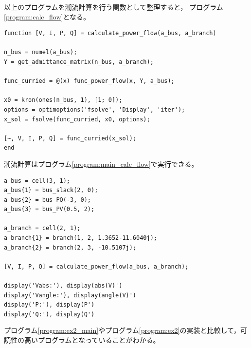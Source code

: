 \documentclass[tombow,dvipdfmx]{corona-a5-1.1}
\begin{document}
{\begin{例}[母線の実装の分離]
以上のプログラムを潮流計算を行う関数として整理すると，
プログラム\ref{program:calc_flow}となる。

\smallskip
\begin{PROGRAMA}[count,title={calculate\_power\_flow.m}]\label{program:calc_flow}
\begin{verbatim}
function [V, I, P, Q] = calculate_power_flow(a_bus, a_branch)

n_bus = numel(a_bus);
Y = get_admittance_matrix(n_bus, a_branch);

func_curried = @(x) func_power_flow(x, Y, a_bus);

x0 = kron(ones(n_bus, 1), [1; 0]);
options = optimoptions('fsolve', 'Display', 'iter');
x_sol = fsolve(func_curried, x0, options);

[~, V, I, P, Q] = func_curried(x_sol);
end
\end{verbatim}
\end{PROGRAMA}

潮流計算はプログラム\ref{program:main_calc_flow}で実行できる。
\smallskip
\begin{PROGRAMA}[count,title={main\_power\_flow.m}]\label{program:main_calc_flow}
\begin{verbatim}
a_bus = cell(3, 1);
a_bus{1} = bus_slack(2, 0);
a_bus{2} = bus_PQ(-3, 0);
a_bus{3} = bus_PV(0.5, 2);

a_branch = cell(2, 1);
a_branch{1} = branch(1, 2, 1.3652-11.6040j);
a_branch{2} = branch(2, 3, -10.5107j);

[V, I, P, Q] = calculate_power_flow(a_bus, a_branch);

display('Vabs:'), display(abs(V)')
display('Vangle:'), display(angle(V)')
display('P:'), display(P')
display('Q:'), display(Q')
\end{verbatim}
\end{PROGRAMA}


プログラム\ref{program:ex2_main}やプログラム\ref{program:ex2}の実装と比較して，可読性の高いプログラムとなっていることがわかる。
\end{例}
}
\end{document}
